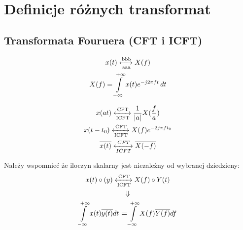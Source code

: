 \section{Definicje różnych transformat}
    \subsection{Transformata Fouruera (CFT i ICFT)}
        \begin{multicols}{2}
            \begin{gather*}
                x(t) \xleftrightarrow[\text{aaa}]{\text{bbb}} X(f)\\
                X(f) = \int\limits_{-\infty}^{+\infty} x(t) e^{-j2\pi f t}  \,dt 
            \end{gather*}

            \begin{gather*}
                x(a t)\xleftrightarrow[\text{ICFT}]{\text{CFT}} \frac{1}{|a|} X(\frac{f}{a})\\
                x(t - t_0)\xleftrightarrow[\text{ICFT}]{\text{CFT}} X(f)e^{-2j\pi ft_0}\\
                \overline{x(t)} \xleftrightarrow[ICFT]{CFT} \overline{X(-f)}
            \end{gather*}
        \end{multicols}
        Należy wspomnieć że iloczyn skalarny jest niezależny od wybranej dziedzieny:
        \begin{gather*}
            x(t)\circ(y) \xleftrightarrow[\text{ICFT}]{\text{CFT}} X(f) \circ Y(t)\\
            \Downarrow\\
            \int\limits^{+\infty}_{-\infty}x(t)\overline{y(t)} dt \ \textbf{=} \int\limits^{+\infty}_{-\infty}X(f)\overline{Y(f)}df
        \end{gather*}


        
